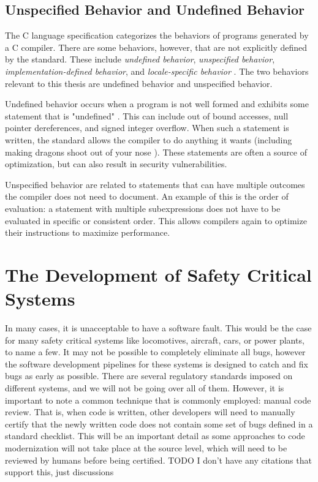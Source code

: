 \subsection{Unspecified Behavior and Undefined Behavior}
The C language specification categorizes the behaviors of programs generated by a C compiler. There are some behaviors, however, that are not explicitly defined by the standard. These include \textit{undefined behavior}, \textit{unspecified behavior}, \textit{implementation-defined behavior}, and \textit{locale-specific behavior} \cite{c_standard}. The two behaviors relevant to this thesis are undefined behavior and unspecified behavior.

Undefined behavior occurs when a program is not well formed and exhibits some statement that is "undefined" \cite{c_standard}. This can include out of bound accesses, null pointer dereferences, and signed integer overflow. When such a statement is written, the standard allows the compiler to do anything it wants (including making dragons shoot out of your nose \cite{nasal_demons}). These statements are often a source of optimization, but can also result in security vulnerabilities.

Unspecified behavior are related to statements that can have multiple outcomes the compiler does not need to document. An example of this is the order of evaluation: a statement with multiple subexpressions does not have to be evaluated in specific or consistent order. This allows compilers again to optimize their instructions to maximize performance.

\section{The Development of Safety Critical Systems}

In many cases, it is unacceptable to have a software fault. This would be the case for many safety critical systems like locomotives, aircraft, cars, or power plants, to name a few. It may not be possible to completely eliminate all bugs, however the software development pipelines for these systems is designed to catch and fix bugs as early as possible. There are several regulatory standards imposed on different systems, and we will not be going over all of them. However, it is important to note a common technique that is commonly employed: manual code review. That is, when code is written, other developers will need to manually certify that the newly written code does not contain some set of bugs defined in a standard checklist. This will be an important detail as some approaches to code modernization will not take place at the source level, which will need to be reviewed by humans before being certified. TODO I don't have any citations that support this, just discussions

